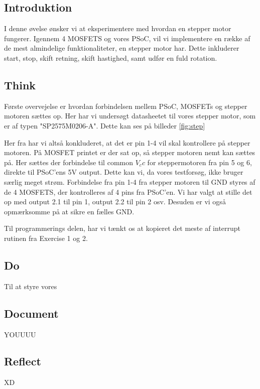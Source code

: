\documentclass[../main.tex]{subfiles}
\begin{document}
\subsection{Introduktion}
I denne øvelse ønsker vi at eksperimentere med hvordan en stepper motor fungerer. Igennem 4 MOSFETS og vores PSoC, vil vi implementere en række af de mest almindelige funktionaliteter, en stepper motor har. Dette inkluderer start, stop, skift retning, skift hastighed, samt udfør en fuld rotation.

\subsection{Think}
Første overvejelse er hvordan forbindelsen mellem PSoC, MOSFETs og stepper motoren sættes op. Her har vi undersøgt datasheetet til vores stepper motor, som er af typen "SP2575M0206-A". Dette kan ses på billeder \ref{fig:step}


Her fra har vi altså konkluderet, at det er pin 1-4 vil skal kontrollere på stepper motoren. På MOSFET printet er der sat op, så stepper motoren nemt kan sættes på. Her sættes der forbindelse til common $V_cc$ for steppermotoren fra pin 5 og 6, direkte til PSoC'ens 5V output. Dette kan vi, da vores testforsøg, ikke bruger særlig meget strøm. Forbindelse fra pin 1-4 fra stepper motoren til GND styres af de 4 MOSFETS, der kontrolleres af 4 pins fra PSoC'en. Vi har valgt at stille det op med output 2.1 til pin 1, output 2.2 til pin 2 osv. Desuden er vi også opmærksomme på at sikre en fælles GND.

Til programmerings delen, har vi tænkt os at kopieret det meste af interrupt rutinen fra Exercise 1 og 2.

\subsection{Do}
Til at styre vores 




\subsection{Document}
YOUUUU

\subsection{Reflect}
XD
\end{document}
